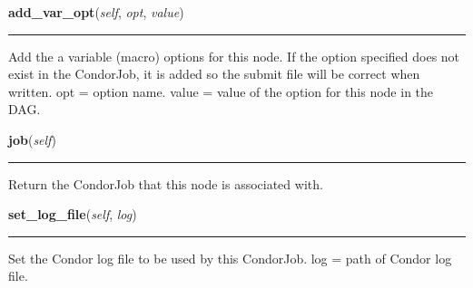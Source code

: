     \label{pipeline:CondorDAGNode:add_var_opt}
    \vspace{0.5ex}

    \noindent\begin{boxedminipage}{\textwidth}

    \raggedright \textbf{add\_var\_opt}(\textit{self}, \textit{opt}, \textit{value})

    \vspace{-1.5ex}

    \rule{\textwidth}{0.5\fboxrule}
    Add the a variable (macro) options for this node. If the option 
    specified does not exist in the CondorJob, it is added so the submit 
    file will be correct when written. opt = option name. value = value 
    of the option for this node in the DAG.

    \vspace{1ex}

    \end{boxedminipage}

    \label{pipeline:CondorDAGNode:job}
    \vspace{0.5ex}

    \noindent\begin{boxedminipage}{\textwidth}

    \raggedright \textbf{job}(\textit{self})

    \vspace{-1.5ex}

    \rule{\textwidth}{0.5\fboxrule}
    Return the CondorJob that this node is associated with.

    \vspace{1ex}

    \end{boxedminipage}

    \label{pipeline:CondorDAGNode:set_log_file}
    \vspace{0.5ex}

    \noindent\begin{boxedminipage}{\textwidth}

    \raggedright \textbf{set\_log\_file}(\textit{self}, \textit{log})

    \vspace{-1.5ex}

    \rule{\textwidth}{0.5\fboxrule}
    Set the Condor log file to be used by this CondorJob. log = path of 
    Condor log file.

    \vspace{1ex}

    \end{boxedminipage}

